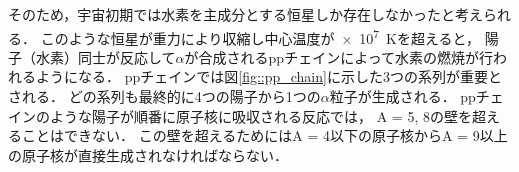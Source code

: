 \documentclass[../master]{subfiles}
\begin{document}
そのため，宇宙初期では水素を主成分とする恒星しか存在しなかったと考えられる．
このような恒星が重力により収縮し中心温度が\SI{e7}{\kelvin}を超えると，
陽子（水素）同士が反応して$\alpha$が合成されるppチェインによって水素の燃焼が行われるようになる．
ppチェインでは図\ref{fig::pp_chain}に示した3つの系列が重要とされる．
どの系列も最終的に4つの陽子から1つの$\alpha$粒子が生成される．
ppチェインのような陽子が順番に原子核に吸収される反応では，
A = 5, 8の壁を超えることはできない．
この壁を超えるためにはA = 4以下の原子核からA = 9以上の原子核が直接生成されなければならない．
\end{document}
